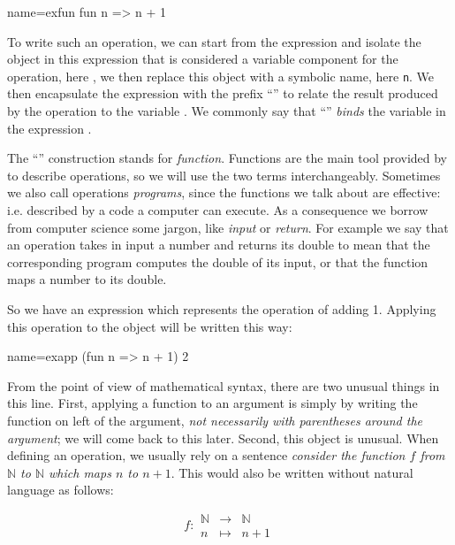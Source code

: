 \begin{coq}{name=exfun}{}
  fun n => n + 1
\end{coq}
To write such an operation, we can start from the expression 
and isolate the object in this expression that is considered a
variable component for the operation, here , we then replace
this object with a symbolic name, here {\tt n}.  We then encapsulate
the expression  with the prefix ``'' to relate
the result produced by the operation to the variable .  We commonly
say that ``'' \emph{binds} the variable  in the expression
.

The ``'' construction stands for \emph{function}.  Functions are the
main tool provided by \Coq{} to describe operations, so we will use the
two terms interchangeably.  Sometimes we also call operations \emph{programs},
since the functions we talk about are effective: i.e. described by a code
a computer can execute.  As a consequence we borrow from computer science
some jargon, like \emph{input} or \emph{return}. For example we say that
an operation takes in input a number and returns its double to mean
that the corresponding program computes the double of its input, or
that the function maps a number to its double.

So we have an expression which represents the operation of adding 1.
Applying this operation to the object  will be written this
way:

\begin{coq}{name=exapp}{}
  (fun n => n + 1) 2
\end{coq}
From the point of view of mathematical syntax, there are two unusual 
things in this line.  First, applying a function to an argument is simply
by writing the function on left of the argument, {\em not necessarily
with parentheses around the argument}; we will come back to this later.
Second, this object  is unusual.  
When defining an operation, we usually
rely on a sentence {\em consider the function \(f\) from {\(\mathbb{N}\)}
to {\(\mathbb{N}\)} which maps \(n\) to \(n + 1\)}.  This would also be
written without natural language as follows:

\begin{equation}\label{equation:f}
f : 
\begin{array}{ccc}
{\mathbb{N}} &\rightarrow& {\mathbb{N}}\\
n &\mapsto& n + 1
\end{array}
\end{equation}

